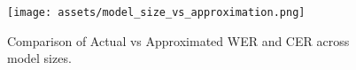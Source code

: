 \begin{figure}
    \centering
    \texttt{[image: assets/model\_size\_vs\_approximation.png]}
    \caption{Comparison of Actual vs Approximated WER and CER across model sizes.}
    \label{fig:enter-label}
\end{figure}
